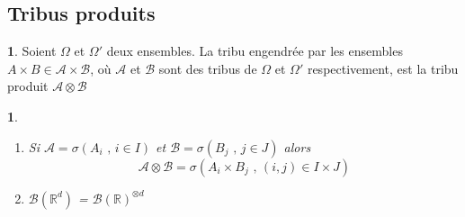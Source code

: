 \documentclass[8pt,notheorems]{beamer}
\def \R{\mathbb R}
\newtheorem{prop}{\translate{Proposition}}
\theoremstyle{definition}
\newtheorem{definition}{\translate{Definition}}
\theoremstyle{example}
\theoremstyle{mystyle}
\theoremstyle{plain}
\begin{document}
\subsection{Tribus produits}
\begin{frame}[allowframebreaks]
\begin{definition}
Soient $\Omega$ et $\Omega'$ deux ensembles. La tribu engendrée par les ensembles $A\times B\in\mathcal{A}\times \mathcal{B}$, où $\mathcal{A}$ et $\mathcal{B}$ sont des tribus de $\Omega$ et $\Omega'$ respectivement, est la tribu produit $\mathcal{A}\otimes \mathcal{B}$
\end{definition}
\begin{prop}
\begin{enumerate}
    \item Si $\mathcal{A} = \sigma(A_i\text{ , }i\in I)$ et $\mathcal{B} = \sigma(B_j\text{ , }j\in J)$ alors 
    $$\mathcal{A}\otimes \mathcal{B} = \sigma(A_i\times B_j\text{ , }(i,j)\in I\times J)$$
    \item $\mathcal{B}(\R^d)$ = $\mathcal{B}(\R)^{\otimes d}$
\end{enumerate}
\end{prop}
\end{frame}
\end{document}
